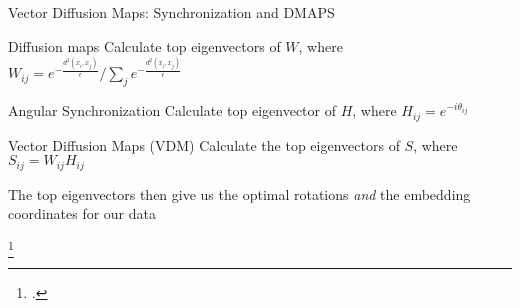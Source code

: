 \begin{frame}{Vector Diffusion Maps: Synchronization and DMAPS}
	
	\begin{minipage}{0.45\textwidth}
	\begin{block}{Diffusion maps}
		Calculate top eigenvectors of $W$, where $W_{ij} = e^{-\frac{d^2(x_i, x_j)}{\epsilon}} / \sum_j e^{-\frac{d^2(x_i, x_j)}{\epsilon}} $
	\end{block}
	\end{minipage}	
	\hfill
	\begin{minipage}{0.45\textwidth}	
	\begin{block}{Angular Synchronization}
		Calculate top eigenvector of $H$, where $H_{ij} = e^{-i \theta_{ij}}$
	\end{block}
	\end{minipage}
	
	\begin{block}{Vector Diffusion Maps (VDM) \footnotemark} 
		Calculate the top eigenvectors of $S$, where $S_{ij} = W_{ij}H_{ij}$
		
		The top eigenvectors then give us the optimal rotations {\em and} the embedding coordinates for our data
	\end{block}
	\footcitetext{singer2012vector}

	\vspace{-0.2in}

\end{frame}